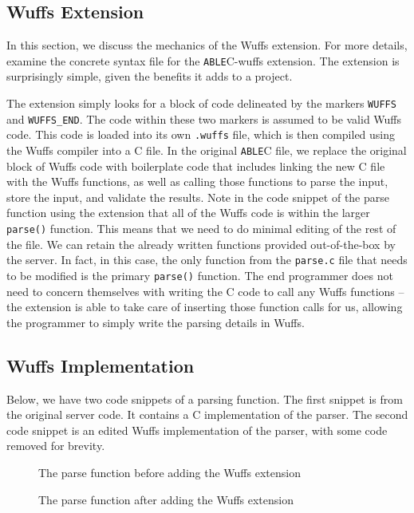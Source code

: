 \documentclass[main.tex]{subfiles}
\begin{document}
\subsection{Wuffs Extension}
In this section, we discuss the mechanics of the Wuffs extension. For more details, examine the concrete syntax file
for the \verb|ABLE|C-wuffs extension. The extension is surprisingly simple, given the benefits it adds to a project.

The extension simply looks for a block of code delineated by the markers \verb|WUFFS| and \verb|WUFFS_END|. The
code within these two markers is assumed to be valid Wuffs code. This code is loaded into its own \verb|.wuffs| file,
which is then compiled using the Wuffs compiler into a C file. In the original \verb|ABLE|C file, we replace the original
block of Wuffs code with boilerplate code that includes linking the new C file with the Wuffs functions, as well as calling
those functions to parse the input, store the input, and validate the results. Note in the code snippet of the parse 
function using the extension that all of the Wuffs code is within the larger \verb|parse()| function. This means that we
need to do minimal editing of the rest of the file. We can retain the already written functions provided out-of-the-box by
the server. In fact, in this case, the only function from the \verb|parse.c| file that needs to be modified is the primary
\verb|parse()| function. The end programmer does not need to concern themselves with writing the C code to call any
Wuffs functions -- the extension is able to take care of inserting those function calls for us, allowing the programmer to
simply write the parsing details in Wuffs.

\subsection{Wuffs Implementation}
Below, we have two code snippets of a parsing function. The first snippet is from the original server code.
It contains a C implementation of the parser. The second code snippet is an edited Wuffs implementation of the parser, with some code removed for brevity. 
\begin{figure}[hp]
	
	\caption{The parse function before adding the Wuffs extension}
\end{figure}
\begin{figure}[hp]
	
	\caption{The parse function after adding the Wuffs extension}
\end{figure}
\end{document}
